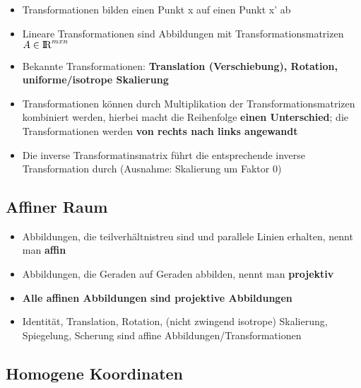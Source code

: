 \documentclass[10pt,a4paper]{article}
\def\realnumbers{{\rm I\!R}}
\begin{document}
	\begin{itemize}
		\item Transformationen bilden einen Punkt x auf einen Punkt x' ab
		\item Lineare Transformationen sind Abbildungen mit Transformationsmatrizen $A \in \realnumbers^{mxn}$
		\item Bekannte Transformationen: \textbf{Translation (Verschiebung), Rotation, uniforme/isotrope Skalierung}
		\item Transformationen können durch Multiplikation der Transformationsmatrizen kombiniert werden, hierbei macht die Reihenfolge \textbf{einen Unterschied}; die Transformationen werden \textbf{von rechts nach links angewandt}
		\item Die inverse Transformatinsmatrix führt die entsprechende inverse Transformation durch (Ausnahme: Skalierung um Faktor 0)
	\end{itemize}

	\subsection{Affiner Raum}
	\label{sub:affiner_raum}

	\begin{itemize}
		\item Abbildungen, die teilverhältnistreu sind und parallele Linien erhalten, nennt man \textbf{affin}
		\item Abbildungen, die Geraden auf Geraden abbilden, nennt man \textbf{projektiv}
		\item \textbf{Alle affinen Abbildungen sind projektive Abbildungen}
		\item Identität, Translation, Rotation, (nicht zwingend isotrope) Skalierung, Spiegelung, Scherung sind affine Abbildungen/Transformationen
	\end{itemize}

	\subsection{Homogene Koordinaten}
	\label{sub:homogene_koordinaten}
	
\end{document}
